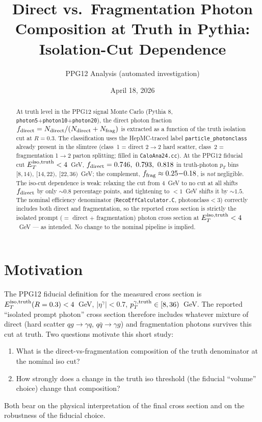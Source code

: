 \documentclass[11pt,a4paper]{article}
\title{Direct vs.\ Fragmentation Photon Composition at Truth in Pythia:\\
Isolation-Cut Dependence}
\author{PPG12 Analysis (automated investigation)}
\date{April 18, 2026}
\begin{document}
\maketitle

\begin{abstract}
At truth level in the PPG12 signal Monte Carlo (Pythia 8, \texttt{photon5}+\texttt{photon10}+\texttt{photon20}), the direct photon fraction $f_{\rm direct} = N_{\rm direct}/(N_{\rm direct}+N_{\rm frag})$ is extracted as a function of the truth isolation cut at $R=0.3$.  The classification uses the HepMC-traced label \texttt{particle\_photonclass} already present in the slimtree (class~1 = direct 2$\to$2 hard scatter, class~2 = fragmentation 1$\to$2 parton splitting; filled in \texttt{CaloAna24.cc}).  At the PPG12 fiducial cut $E_T^{\rm iso,truth}<4$~GeV, $f_{\rm direct} = 0.746,~0.793,~0.818$ in truth-photon $p_T$ bins $[8,14),~[14,22),~[22,36)$~GeV; the complement, $f_{\rm frag}\approx 0.25{-}0.18$, is \emph{not} negligible.  The iso-cut dependence is weak: relaxing the cut from $4$~GeV to no cut at all shifts $f_{\rm direct}$ by only $\sim 0.8$ percentage points, and tightening to $<1$~GeV shifts it by $\sim 1.5$.  The nominal efficiency denominator (\texttt{RecoEffCalculator.C}, photonclass${<}3$) correctly includes both direct and fragmentation, so the reported cross section is strictly the isolated prompt ($=$ direct $+$ fragmentation) photon cross section at $E_T^{\rm iso,truth}<4$~GeV --- as intended.  No change to the nominal pipeline is implied.
\end{abstract}

\section{Motivation}
\label{sec:motivation}

The PPG12 fiducial definition for the measured cross section is
$E_T^{\rm iso,truth}(R=0.3) < 4$~GeV, $|\eta^{\gamma}|<0.7$, $p_T^{\gamma,\rm truth}\in[8,36)$~GeV.  The reported ``isolated prompt photon'' cross section therefore includes whatever mixture of direct (hard scatter $qg\to\gamma q$, $q\bar q\to\gamma g$) and fragmentation photons survives this cut at truth.  Two questions motivate this short study:
\begin{enumerate}
\item What is the direct-vs-fragmentation composition of the truth denominator at the nominal iso cut?
\item How strongly does a change in the truth iso threshold (the fiducial ``volume'' choice) change that composition?
\end{enumerate}
Both bear on the physical interpretation of the final cross section and on the robustness of the fiducial choice.
\end{document}
